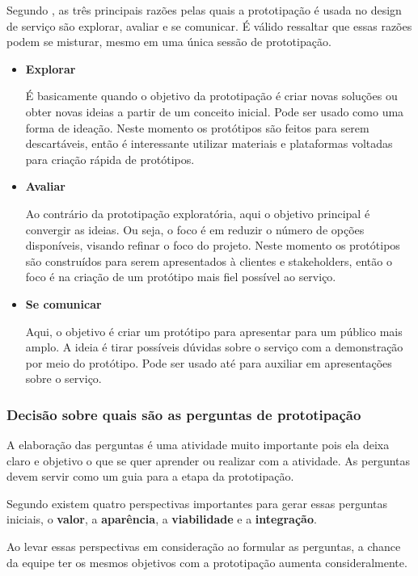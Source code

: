 Segundo \cite{Stickdorn2019}, as três principais razões pelas quais a prototipação é usada no design de serviço são explorar, avaliar e se comunicar. É válido ressaltar que essas razões podem se misturar, mesmo em uma única sessão de prototipação.

\begin{itemize}
	\item \textbf{Explorar}
	
	É basicamente quando o objetivo da prototipação é criar novas soluções ou obter novas ideias a partir de um conceito inicial. Pode ser usado como uma forma de ideação. Neste momento os protótipos são feitos para serem descartáveis, então é interessante utilizar materiais e plataformas voltadas para criação rápida de protótipos.
	
	\item \textbf{Avaliar}
	
	Ao contrário da prototipação exploratória, aqui o objetivo principal é convergir as ideias. Ou seja, o foco é em reduzir o número de opções disponíveis, visando refinar o foco do projeto. Neste momento os protótipos são construídos para serem apresentados à clientes e stakeholders, então o foco é na criação de um protótipo mais fiel possível ao serviço.
	
	\item \textbf{Se comunicar}
	
	Aqui, o objetivo é criar um protótipo para apresentar para um público mais amplo. A ideia é tirar possíveis dúvidas sobre o serviço com a demonstração por meio do protótipo. Pode ser usado até para auxiliar em apresentações sobre o serviço.
	
\end{itemize}

\subsubsection{Decisão sobre quais são as perguntas de prototipação}

A elaboração das perguntas é uma atividade muito importante pois ela deixa claro e objetivo o que se quer aprender ou realizar com a atividade. As perguntas devem servir como um guia para a etapa da prototipação.

Segundo \cite{Stickdorn2019} existem quatro perspectivas importantes para gerar essas perguntas iniciais, o \textbf{valor}, a \textbf{aparência}, a \textbf{viabilidade} e a \textbf{integração}. 

Ao levar essas perspectivas em consideração ao formular as perguntas, a chance da equipe ter os mesmos objetivos com a prototipação aumenta consideralmente.

